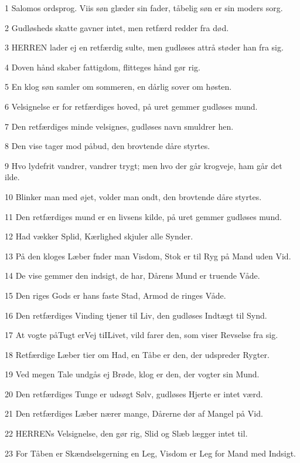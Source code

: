\par 1 Salomos ordsprog. Viis søn glæder sin fader, tåbelig søn er sin moders sorg.
\par 2 Gudløsheds skatte gavner intet, men retfærd redder fra død.
\par 3 HERREN lader ej en retfærdig sulte, men gudløses attrå støder han fra sig.
\par 4 Doven hånd skaber fattigdom, flitteges hånd gør rig.
\par 5 En klog søn samler om sommeren, en dårlig sover om høsten.
\par 6 Velsignelse er for retfærdiges hoved, på uret gemmer gudløses mund.
\par 7 Den retfærdiges minde velsignes, gudløses navn smuldrer hen.
\par 8 Den vise tager mod påbud, den brovtende dåre styrtes.
\par 9 Hvo lydefrit vandrer, vandrer trygt; men hvo der går krogveje, ham går det ilde.
\par 10 Blinker man med øjet, volder man ondt, den brovtende dåre styrtes.
\par 11 Den retfærdiges mund er en livsens kilde, på uret gemmer gudløses mund.
\par 12 Had vækker Splid, Kærlighed skjuler alle Synder.
\par 13 På den kloges Læber fnder man Visdom, Stok er til Ryg på Mand uden Vid.
\par 14 De vise gemmer den indsigt, de har, Dårens Mund er truende Våde.
\par 15 Den riges Gods er hans faste Stad, Armod de ringes Våde.
\par 16 Den retfærdiges Vinding tjener til Liv, den gudløses Indtægt til Synd.
\par 17 At vogte påTugt erVej tiILivet, vild farer den, som viser Revselse fra sig.
\par 18 Retfærdige Læber tier om Had, en Tåbe er den, der udspreder Rygter.
\par 19 Ved megen Tale undgås ej Brøde, klog er den, der vogter sin Mund.
\par 20 Den retfærdiges Tunge er udsøgt Sølv, gudløses Hjerte er intet værd.
\par 21 Den retfærdiges Læber nærer mange, Dårerne dør af Mangel på Vid.
\par 22 HERRENs Velsignelse, den gør rig, Slid og Slæb lægger intet til.
\par 23 For Tåben er Skændselsgerning en Leg, Visdom er Leg for Mand med Indsigt.

